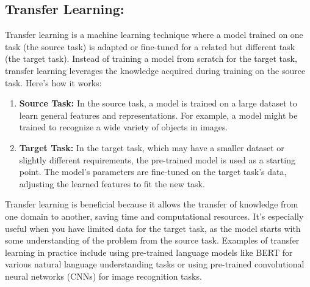 \documentclass[12pt,a4paper,twoside]{article}
\begin{document}
	\subsection{Transfer Learning:}
	Transfer learning is a machine learning technique where a model trained on one task (the source task) is adapted or fine-tuned for a related but different task (the target task). Instead of training a model from scratch for the target task, transfer learning leverages the knowledge acquired during training on the source task. Here's how it works:
	\begin{enumerate}
		\item \textbf{Source Task:} In the source task, a model is trained on a large dataset to learn general features and representations. For example, a model might be trained to recognize a wide variety of objects in images.
		
		\item \textbf{Target Task:} In the target task, which may have a smaller dataset or slightly different requirements, the pre-trained model is used as a starting point. The model's parameters are fine-tuned on the target task's data, adjusting the learned features to fit the new task.
	\end{enumerate}
	Transfer learning is beneficial because it allows the transfer of knowledge from one domain to another, saving time and computational resources. It's especially useful when you have limited data for the target task, as the model starts with some understanding of the problem from the source task. Examples of transfer learning in practice include using pre-trained language models like BERT for various natural language understanding tasks or using pre-trained convolutional neural networks (CNNs) for image recognition tasks.
\end{document}
